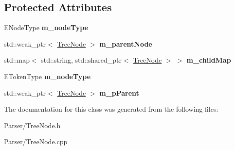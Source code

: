 \subsection*{Protected Attributes}
\begin{DoxyCompactItemize}
\item 
E\+Node\+Type {\bfseries m\+\_\+node\+Type}\hypertarget{class_parser_1_1_tree_node_add5798e3cf8c66136027cc2bf0966efb}{}\label{class_parser_1_1_tree_node_add5798e3cf8c66136027cc2bf0966efb}

\item 
std\+::weak\+\_\+ptr$<$ \hyperlink{class_parser_1_1_tree_node}{Tree\+Node} $>$ {\bfseries m\+\_\+parent\+Node}\hypertarget{class_parser_1_1_tree_node_a745168207785c3e1cd12ca4205f8da53}{}\label{class_parser_1_1_tree_node_a745168207785c3e1cd12ca4205f8da53}

\item 
std\+::map$<$ std\+::string, std\+::shared\+\_\+ptr$<$ \hyperlink{class_parser_1_1_tree_node}{Tree\+Node} $>$ $>$ {\bfseries m\+\_\+child\+Map}\hypertarget{class_parser_1_1_tree_node_a9a87c47a4116da5e0d5f016afc4149e1}{}\label{class_parser_1_1_tree_node_a9a87c47a4116da5e0d5f016afc4149e1}

\item 
E\+Token\+Type {\bfseries m\+\_\+node\+Type}\hypertarget{class_parser_1_1_tree_node_a2a4e098a43880ce9c30051163aed59c8}{}\label{class_parser_1_1_tree_node_a2a4e098a43880ce9c30051163aed59c8}

\item 
std\+::weak\+\_\+ptr$<$ \hyperlink{class_parser_1_1_tree_node}{Tree\+Node} $>$ {\bfseries m\+\_\+p\+Parent}\hypertarget{class_parser_1_1_tree_node_a844c2318d0df9555f25721e47fea0ab9}{}\label{class_parser_1_1_tree_node_a844c2318d0df9555f25721e47fea0ab9}

\end{DoxyCompactItemize}


The documentation for this class was generated from the following files\+:\begin{DoxyCompactItemize}
\item 
Parser/Tree\+Node.\+h\item 
Parser/Tree\+Node.\+cpp\end{DoxyCompactItemize}
